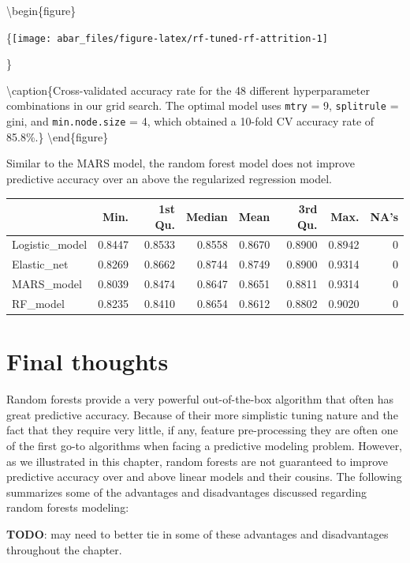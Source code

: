 \documentclass[]{book}
\theoremstyle{definition}
\theoremstyle{definition}
\theoremstyle{definition}
\theoremstyle{remark}
\begin{document}
\textbackslash{}begin\{figure\}

\{\centering \texttt{[image: abar\_files/figure-latex/rf-tuned-rf-attrition-1]}

\}

\textbackslash{}caption\{Cross-validated accuracy rate for the 48
different hyperparameter combinations in our grid search. The optimal
model uses \texttt{mtry} = 9, \texttt{splitrule} = gini, and
\texttt{min.node.size} = 4, which obtained a 10-fold CV accuracy rate of
85.8\%.\}\label{fig:rf-tuned-rf-attrition} \textbackslash{}end\{figure\}

Similar to the MARS model, the random forest model does not improve
predictive accuracy over an above the regularized regression model.

\begin{table}[H]
\centering
\begin{tabular}{l|r|r|r|r|r|r|r}
\hline
  & Min. & 1st Qu. & Median & Mean & 3rd Qu. & Max. & NA's\\
\hline
Logistic\_model & 0.8447 & 0.8533 & 0.8558 & 0.8670 & 0.8900 & 0.8942 & 0\\
\hline
Elastic\_net & 0.8269 & 0.8662 & 0.8744 & 0.8749 & 0.8900 & 0.9314 & 0\\
\hline
MARS\_model & 0.8039 & 0.8474 & 0.8647 & 0.8651 & 0.8811 & 0.9314 & 0\\
\hline
RF\_model & 0.8235 & 0.8410 & 0.8654 & 0.8612 & 0.8802 & 0.9020 & 0\\
\hline
\end{tabular}
\end{table}

\hypertarget{final-thoughts-4}{%
\section{Final thoughts}\label{final-thoughts-4}}

Random forests provide a very powerful out-of-the-box algorithm that
often has great predictive accuracy. Because of their more simplistic
tuning nature and the fact that they require very little, if any,
feature pre-processing they are often one of the first go-to algorithms
when facing a predictive modeling problem. However, as we illustrated in
this chapter, random forests are not guaranteed to improve predictive
accuracy over and above linear models and their cousins. The following
summarizes some of the advantages and disadvantages discussed regarding
random forests modeling:

\textbf{TODO}: may need to better tie in some of these advantages and
disadvantages throughout the chapter.
\end{document}
